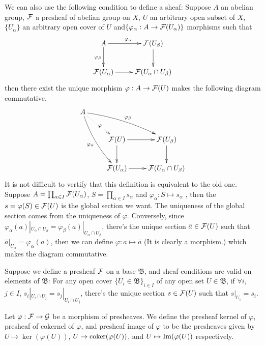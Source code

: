 \documentclass[10pt]{extbook}
\begin{document}


\para We can also use the following condition to define a sheaf: Suppose $A$ an abelian group, 
$\mathcal{F}$ a presheaf of abelian group on $X$, $U$ an arbitrary open subset of $X$, $\{U_\alpha\}$ 
an arbitrary open cover of $U$ and$\{\varphi_\alpha:A\to \mathcal{F}(U_\alpha)\}$ morphisms such that
\[
	\xymatrix{
		A\ar[r]^{\varphi_{\alpha}}\ar[d]_{\varphi_{\beta}}&\calf(U_\beta)\ar[d]\\
		\calf(U_\alpha)\ar[r]&\calf(U_{\alpha}\cap U_{\beta})
	}
\]
then there exist the unique morphism $\varphi:A\to \mathcal{F}(U)$ makes the following diagram 
commutative.
\[
	\xymatrix{
		A\ar@/_/[ddr]_{\varphi_{\alpha}}\ar@/^/[drr]^{\varphi_{\beta}}\ar@{.>}[dr]|{\varphi}&& \\
		&\calf(U)\ar[r]\ar[d]&\calf(U_\beta)\ar[d]\\
		&\calf(U_\alpha)\ar[r]&\calf(U_{\alpha}\cap U_{\beta})
	}
\]
It is not difficult to vertify that this definition is equivalent to the old one. Suppose 
$A=\prod_{\alpha\in I}\mathcal{F}(U_\alpha)$, $S=\prod_{\alpha\in I}s_\alpha$ and 
$\varphi_{\alpha}: S\mapsto s_{\alpha}$ , then the $s=\varphi(S) \in \mathcal{F}(U)$ is the global 
section we want. The uniqueness of the global section comes from the uniqueness of $\varphi$.
Conversely, since 
$\varphi_\alpha(a)|_{U_\alpha \cap U_\beta}=\varphi_\beta(a)|_{U_\alpha \cap U_\beta}$, 
there's the unique section $\bar{a} \in \mathcal{F}(U)$ such that 
$\bar{a}|_{U_\alpha}=\varphi_\alpha(a)$, then we can define $\varphi: a \mapsto \bar{a}$ 
(It is clearly a morphism.) which makes the diagram commutative.

\para Suppose we define a presheaf $\mathcal{F}$ on a base $\mathfrak{B}$, and sheaf conditions 
are valid on elements of $\mathfrak{B}$: For any open cover $\{U_i\in \mathfrak{B}\}_{i\in I}$ 
of any open set $U\in \mathfrak{B}$, if $\forall i$, $j\in I$, $s_i|_{U_i\cap U_j}=s_j|_{U_i\cap U_j}$, 
there's the unique section $s\in\mathcal{F}(U)$ such that $s|_{U_i}=s_i$.

\para Let $\varphi:\mathcal{F}\to\mathcal{G}$ be a morphism of presheaves. We define the presheaf kernel 
of $\varphi$, presheaf of cokernel of $\varphi$, and presheaf image of $\varphi$ to be the 
presheaves given by $U\mapsto \ker(\varphi(U))$, $U\to \operatorname{coker}(\varphi(U))$, and 
$U\mapsto \operatorname{Im}(\varphi(U))$ respectively.
\end{document}
